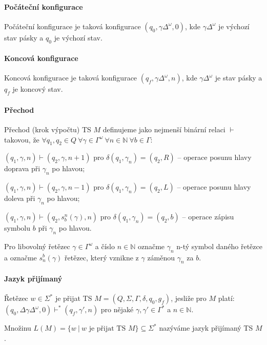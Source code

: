 \paragraph*{Počáteční konfigurace} Počáteční konfigurace je taková konfigurace $(q_0, \gamma \Delta^{\omega}, 0)$, kde $\gamma \Delta^{\omega}$ je výchozí stav pásky a $q_0$ je výchozí stav.

\paragraph*{Koncová konfigurace} Koncová konfigurace je taková konfigurace $(q_f, \gamma \Delta^{\omega}, n)$, kde $\gamma \Delta^{\omega}$ je stav pásky a $q_f$ je koncový stav.

\paragraph*{Přechod} Přechod (krok výpočtu) TS $M$ definujeme jako nejmenší binární relaci $\vdash$ takovou, že $\forall q_1, q_2 \in Q ~ \forall \gamma \in \Gamma^{\omega} ~ \forall n \in \mathbb{N} ~ \forall b \in \Gamma$: \begin{compactitem}
    \item $(q_1, \gamma, n) \vdash (q_2, \gamma, n + 1)$ pro $\delta(q_1, \gamma_n) = (q_2, R)$ -- operace posunu hlavy doprava při $\gamma_n$ po hlavou;

    \item $(q_1, \gamma, n) \vdash (q_2, \gamma, n - 1)$ pro $\delta(q_1, \gamma_n) = (q_2, L)$ -- operace posunu hlavy doleva při $\gamma_n$ po hlavou;

    \item $(q_1, \gamma, n) \vdash (q_2, s_b^n(\gamma), n)$ pro $\delta(q_1, \gamma_n) = (q_2, b)$ -- operace zápisu symbolu $b$ při $\gamma_n$ po hlavou.
\end{compactitem}

Pro libovolný řetězec $\gamma \in \Gamma^{\omega}$ a číslo $n \in \mathbb{N}$ označme $\gamma_n$ n-tý symbol daného řetězce a označme $s_n^b(\gamma)$ řetězec, který vznikne z $\gamma$ záměnou $\gamma_n$ za $b$.

\paragraph*{Jazyk přijímaný} \begin{compactitem}
    \item Řetězec $w \in \Sigma^*$ je přijat TS $M = (Q, \Sigma, \Gamma, \delta, q_0, g_f)$, jesliže pro $M$ platí:\break $(q_0, \Delta \gamma \Delta^{\omega}, 0) \vdash^* (q_f, \gamma', n)$ pro nějaké $\gamma, \gamma' \in \Gamma^*$ a $n \in \mathbb{N}$.

    \item Množinu $L(M) = \{ w ~|~ w \text{ je přijat TS } M \} \subseteq \Sigma^*$ nazýváme jazyk přijímaný TS $M$.
\end{compactitem}

